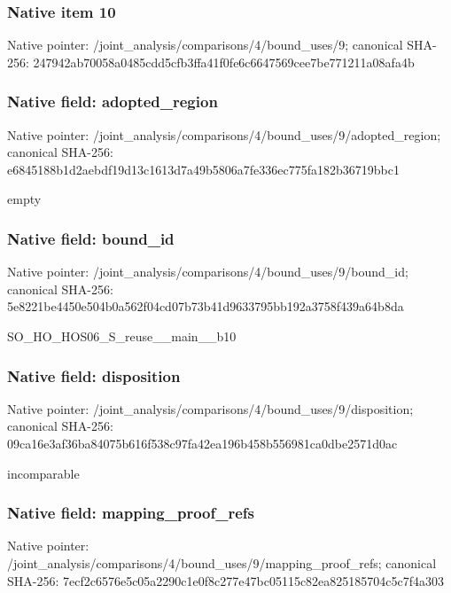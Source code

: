 \documentclass[10pt,a4paper]{article}
\begin{document}
\subsubsection{Native item 10}
Native pointer: /joint\_\allowbreak{}analysis/comparisons/4/bound\_\allowbreak{}uses/9; canonical SHA-256: 247942ab70058a0485cdd5cfb3ffa41f0fe6c6647569cee7be771211a08afa4b

\subsubsection{Native field: adopted\_\allowbreak{}region}
Native pointer: /joint\_\allowbreak{}analysis/comparisons/4/bound\_\allowbreak{}uses/9/adopted\_\allowbreak{}region; canonical SHA-256: e6845188b1d2aebdf19d13c1613d7a49b5806a7fe336ec775fa182b36719bbc1

\begingroup\raggedright\sloppy empty\par\endgroup

\subsubsection{Native field: bound\_\allowbreak{}id}
Native pointer: /joint\_\allowbreak{}analysis/comparisons/4/bound\_\allowbreak{}uses/9/bound\_\allowbreak{}id; canonical SHA-256: 5e8221be4450e504b0a562f04cd07b73b41d9633795bb192a3758f439a64b8da

\begingroup\raggedright\sloppy SO\_\allowbreak{}HO\_\allowbreak{}HOS06\_\allowbreak{}S\_\allowbreak{}reuse\_\allowbreak{}\_\allowbreak{}main\_\allowbreak{}\_\allowbreak{}b10\par\endgroup

\subsubsection{Native field: disposition}
Native pointer: /joint\_\allowbreak{}analysis/comparisons/4/bound\_\allowbreak{}uses/9/disposition; canonical SHA-256: 09ca16e3af36ba84075b616f538c97fa42ea196b458b556981ca0dbe2571d0ac

\begingroup\raggedright\sloppy incomparable\par\endgroup

\subsubsection{Native field: mapping\_\allowbreak{}proof\_\allowbreak{}refs}
Native pointer: /joint\_\allowbreak{}analysis/comparisons/4/bound\_\allowbreak{}uses/9/mapping\_\allowbreak{}proof\_\allowbreak{}refs; canonical SHA-256: 7ecf2c6576e5c05a2290c1e0f8c277e47bc05115c82ea825185704c5c7f4a303
\end{document}
